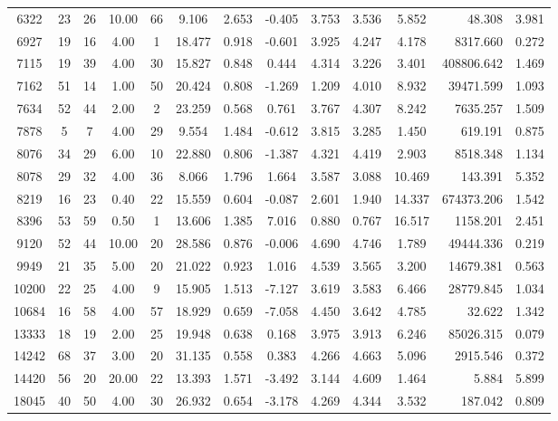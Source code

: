 \documentclass[mnsc]{informs3}
\begin{document}
\begin{APPENDICES}
\begin{longtable}{cccccccccccrc}
6322 & 23 & 26 & 10.00 & 66 & 9.106 & 2.653 & -0.405 & 3.753 & 3.536 & 5.852 & 48.308 & 3.981 \\
6927 & 19 & 16 & 4.00 & 1 & 18.477 & 0.918 & -0.601 & 3.925 & 4.247 & 4.178 & 8317.660 & 0.272 \\
7115 & 19 & 39 & 4.00 & 30 & 15.827 & 0.848 & 0.444 & 4.314 & 3.226 & 3.401 & 408806.642 & 1.469 \\
7162 & 51 & 14 & 1.00 & 50 & 20.424 & 0.808 & -1.269 & 1.209 & 4.010 & 8.932 & 39471.599 & 1.093 \\
7634 & 52 & 44 & 2.00 & 2 & 23.259 & 0.568 & 0.761 & 3.767 & 4.307 & 8.242 & 7635.257 & 1.509 \\
7878 & 5 & 7 & 4.00 & 29 & 9.554 & 1.484 & -0.612 & 3.815 & 3.285 & 1.450 & 619.191 & 0.875 \\
8076 & 34 & 29 & 6.00 & 10 & 22.880 & 0.806 & -1.387 & 4.321 & 4.419 & 2.903 & 8518.348 & 1.134 \\
8078 & 29 & 32 & 4.00 & 36 & 8.066 & 1.796 & 1.664 & 3.587 & 3.088 & 10.469 & 143.391 & 5.352 \\
8219 & 16 & 23 & 0.40 & 22 & 15.559 & 0.604 & -0.087 & 2.601 & 1.940 & 14.337 & 674373.206 & 1.542 \\
8396 & 53 & 59 & 0.50 & 1 & 13.606 & 1.385 & 7.016 & 0.880 & 0.767 & 16.517 & 1158.201 & 2.451 \\
9120 & 52 & 44 & 10.00 & 20 & 28.586 & 0.876 & -0.006 & 4.690 & 4.746 & 1.789 & 49444.336 & 0.219 \\
9949 & 21 & 35 & 5.00 & 20 & 21.022 & 0.923 & 1.016 & 4.539 & 3.565 & 3.200 & 14679.381 & 0.563 \\
10200 & 22 & 25 & 4.00 & 9 & 15.905 & 1.513 & -7.127 & 3.619 & 3.583 & 6.466 & 28779.845 & 1.034 \\
10684 & 16 & 58 & 4.00 & 57 & 18.929 & 0.659 & -7.058 & 4.450 & 3.642 & 4.785 & 32.622 & 1.342 \\
13333 & 18 & 19 & 2.00 & 25 & 19.948 & 0.638 & 0.168 & 3.975 & 3.913 & 6.246 & 85026.315 & 0.079 \\
14242 & 68 & 37 & 3.00 & 20 & 31.135 & 0.558 & 0.383 & 4.266 & 4.663 & 5.096 & 2915.546 & 0.372 \\
14420 & 56 & 20 & 20.00 & 22 & 13.393 & 1.571 & -3.492 & 3.144 & 4.609 & 1.464 & 5.884 & 5.899 \\
18045 & 40 & 50 & 4.00 & 30 & 26.932 & 0.654 & -3.178 & 4.269 & 4.344 & 3.532 & 187.042 & 0.809 \\

\end{longtable}
\end{APPENDICES}
\end{document}
